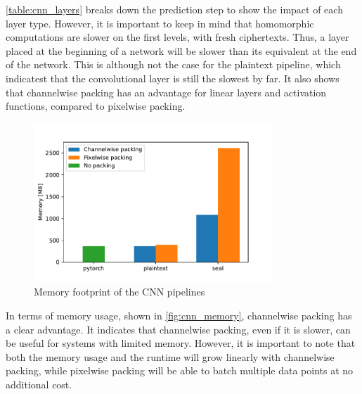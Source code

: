 \documentclass[a4paper,11pt,oneside]{report}
\begin{document}
\autoref{table:cnn_layers} breaks down the prediction step to show the impact of each layer type. 
However, it is important to keep in mind that homomorphic computations are slower on the first levels, with fresh ciphertexts. 
Thus, a layer placed at the beginning of a network will be slower than its equivalent at the end of the network.
This is although not the case for the plaintext pipeline, which indicatest that the convolutional layer is still the slowest by far.
It also shows that channelwise packing has an advantage for linear layers and activation functions, compared to pixelwise packing.


\begin{figure}[h!]
  \centering
  \includegraphics[width=0.8\textwidth]{figures/cnn_mem.pdf}
  \caption{Memory footprint of the CNN pipelines}
  \label{fig:cnn_memory}
\end{figure}

In terms of memory usage, shown in \autoref{fig:cnn_memory}, channelwise packing has a clear advantage.
It indicates that channelwise packing, even if it is slower, can be useful for systems with limited memory.
However, it is important to note that both the memory usage and the runtime will grow linearly with channelwise packing, while pixelwise packing will be able to batch multiple data points at no additional cost.
\end{document}
